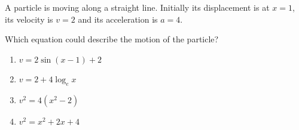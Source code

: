 
\begin{problem}
A particle is moving along a straight line. Initially its displacement is at $x = 1$, its velocity is $v = 2$ and its acceleration is $a = 4$.

\vspace{0.5cm}

\noindent Which equation could describe the motion of the particle?

\begin{enumerate}[label=\Alph*.]
    \item $v = 2\sin(x-1) + 2$
    \item $v = 2 + 4\log_e x$
    \item $v^2 = 4(x^2 - 2)$
    \item $v^2 = x^2 + 2x + 4$
\end{enumerate}
\end{problem}

